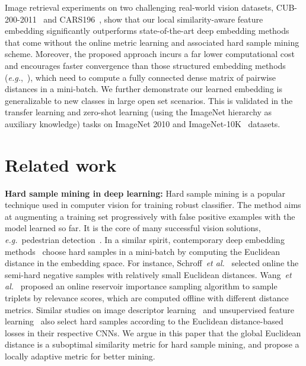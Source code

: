 \documentclass{article}
\newcommand{\etal}{\emph{et al.}}
\newcommand{\eg}{\emph{e.g.}}
\begin{document}
Image retrieval experiments on two challenging real-world vision datasets, CUB-200-2011~\cite{WahCUB2002011} and CARS196~\cite{Krause2013}, show that our local similarity-aware feature embedding significantly outperforms state-of-the-art deep embedding methods that come without the online metric learning and associated hard sample mining scheme. Moreover, the proposed approach incurs a far lower computational cost and encourages faster convergence than those structured embedding methods (\eg,~\cite{songCVPR16}), which need to compute a fully connected dense matrix of pairwise distances in a mini-batch. We further demonstrate our learned embedding is generalizable to new classes in large open set scenarios. This is validated in the transfer learning and zero-shot learning (using the ImageNet hierarchy as auxiliary knowledge) tasks on ImageNet 2010 and ImageNet-10K~\cite{Deng2010} datasets.

\section{Related work}

\textbf{Hard sample mining in deep learning:}
Hard sample mining is a popular technique used in computer vision for training robust classifier. The method aims at augmenting a training set progressively with false positive examples with the model learned so far. It is the core of many successful vision solutions, \eg~pedestrian detection~\cite{dalal2005histograms,Felzenszwalb2010}.
In a similar spirit, contemporary deep embedding methods~\cite{Schroff2015,songCVPR16} choose hard samples in a mini-batch by computing the Euclidean distance in the embedding space. For instance, Schroff~\etal~\cite{Schroff2015} selected online the semi-hard negative samples with relatively small Euclidean distances. Wang~\etal~\cite{Wang2014} proposed an online reservoir importance sampling algorithm to sample triplets by relevance scores, which are computed offline with different distance metrics. Similar studies on image descriptor learning~\cite{SimoSerra2015} and unsupervised feature learning~\cite{Wang2015ICCV} also select hard samples according to the Euclidean distance-based losses in their respective CNNs. We argue in this paper that the global Euclidean distance is a suboptimal similarity metric for hard sample mining, and propose a locally adaptive metric for better mining.
\end{document}

